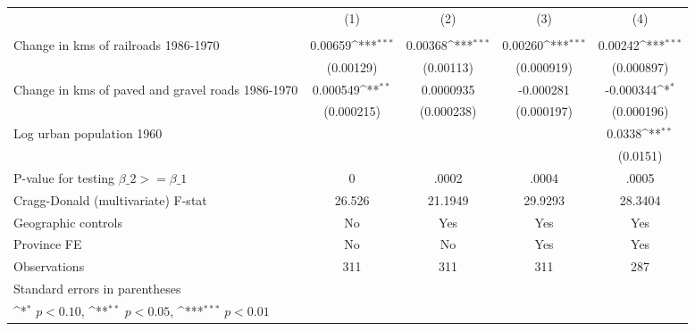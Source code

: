 {
\def\sym#1{\ifmmode^{#1}\else\(^{#1}\)\fi}
\begin{tabular}{l*{4}{c}}
\hline\hline
                &\multicolumn{1}{c}{(1)}&\multicolumn{1}{c}{(2)}&\multicolumn{1}{c}{(3)}&\multicolumn{1}{c}{(4)}\\
                &\multicolumn{1}{c}{}&\multicolumn{1}{c}{}&\multicolumn{1}{c}{}&\multicolumn{1}{c}{}\\
\hline
Change in kms of railroads 1986-1970&  0.00659\sym{***}&  0.00368\sym{***}&  0.00260\sym{***}&  0.00242\sym{***}\\
                &(0.00129)         &(0.00113)         &(0.000919)         &(0.000897)         \\
[1em]
Change in kms of paved and gravel roads 1986-1970& 0.000549\sym{**} &0.0000935         &-0.000281         &-0.000344\sym{*}  \\
                &(0.000215)         &(0.000238)         &(0.000197)         &(0.000196)         \\
[1em]
Log urban population 1960&                  &                  &                  &   0.0338\sym{**} \\
                &                  &                  &                  & (0.0151)         \\
\hline
P-value for testing $\beta\_{2} >= \beta\_{1}$&        0         &    .0002         &    .0004         &    .0005         \\
Cragg-Donald (multivariate) F-stat&   26.526         &  21.1949         &  29.9293         &  28.3404         \\
Geographic controls&       No         &      Yes         &      Yes         &      Yes         \\
Province FE     &       No         &       No         &      Yes         &      Yes         \\
Observations    &      311         &      311         &      311         &      287         \\
\hline\hline
\multicolumn{5}{l}{\footnotesize Standard errors in parentheses}\\
\multicolumn{5}{l}{\footnotesize \sym{*} \(p<0.10\), \sym{**} \(p<0.05\), \sym{***} \(p<0.01\)}\\
\end{tabular}
}
